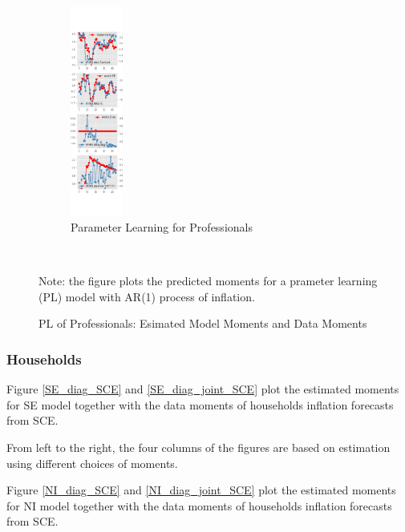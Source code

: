 \documentclass[]{article}
\begin{document}
\begin{figure}[ht]
	\centering
	\begin{subfigure}[b]{\textwidth}
		\centering
		\caption{Parameter Learning for Professionals}
		\label{PL_diag_SPF}
		\includegraphics[width=0.19\textwidth]{figures/spf_pl_est_diag.png}
	\end{subfigure} \\
	\begin{flushleft}
		{\footnotesize Note: the figure plots the predicted moments for a prameter learning (PL) model with AR(1) process of inflation.}
	\end{flushleft}
	\caption{PL of Professionals: Esimated Model Moments and Data Moments}
\end{figure}


\subsubsection{Households}


Figure \ref{SE_diag_SCE} and \ref{SE_diag_joint_SCE} plot the estimated moments for SE model together with the data moments of households inflation forecasts from SCE. 

From left to the right, the four columns of the figures are based on estimation using different choices of moments. 

Figure \ref{NI_diag_SCE} and \ref{NI_diag_joint_SCE} plot the estimated moments for NI model together with the data moments of households inflation forecasts from SCE. 
\end{document}
